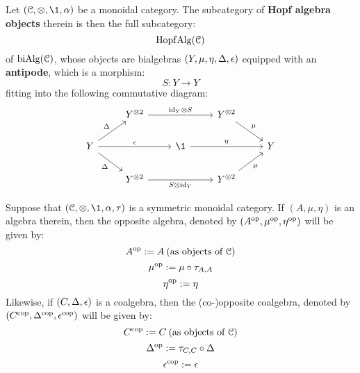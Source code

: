         \begin{definition} \label{def: hopf_algebras_in_monoidal_categories}
            Let $(\C, \tensor, \1, \alpha)$ be a monoidal category. The subcategory of \textbf{Hopf algebra objects} therein is then the full subcategory:
                $$\mathrm{Hopf}\mathrm{Alg}(\mathcal{C})$$
            of $\mathrm{bi}\mathrm{Alg}(\mathcal{C})$, whose objects are bialgebras $(Y, \mu, \eta, \Delta, \epsilon)$ equipped with an \textbf{antipode}, which is a morphism:
                $$S: Y \to Y$$
            fitting into the following commutative diagram:
                $$
                    \begin{tikzcd}
                	& {Y^{\tensor 2}} && {Y^{\tensor 2}} \\
                	Y && \1 && Y \\
                	& {Y^{\tensor 2}} && {Y^{\tensor 2}}
                	\arrow["{\id_Y \tensor S}", from=1-2, to=1-4]
                	\arrow["\mu", from=1-4, to=2-5]
                	\arrow["\Delta", from=2-1, to=1-2]
                	\arrow["\e", from=2-1, to=2-3]
                	\arrow["\Delta"', from=2-1, to=3-2]
                	\arrow["\eta", from=2-3, to=2-5]
                	\arrow["{S \tensor \id_Y}"', from=3-2, to=3-4]
                	\arrow["\mu"', from=3-4, to=2-5]
                    \end{tikzcd}
                $$
        \end{definition}
        \begin{convention}
            Suppose that $(\C, \tensor, \1, \alpha, \tau)$ is a symmetric monoidal category. If $(A, \mu, \eta)$ is an algebra therein, then the opposite algebra, denoted by $(A^{\mathrm{op}}, \mu^{\mathrm{op}}, \eta^{\mathrm{op}})$ will be given by:
                $$A^{\mathrm{op}} := A \: \text{(as objects of $\mathcal{C}$)}$$
                $$\mu^{\mathrm{op}} := \mu \circ \tau_{A, A}$$
                $$\eta^{\mathrm{op}} := \eta$$
            Likewise, if $(C, \Delta, \epsilon)$ is a coalgebra, then the (co-)opposite coalgebra, denoted by $(C^{\mathrm{cop}}, \Delta^{\mathrm{cop}}, \epsilon^{\mathrm{cop}})$ will be given by:
                $$C^{\mathrm{cop}} := C \: \text{(as objects of $\mathcal{C}$)}$$
                $$\Delta^{\mathrm{op}} := \tau_{C, C} \circ \Delta$$
                $$\epsilon^{\mathrm{cop}} := \epsilon$$
        \end{convention}
        \begin{lemma} \label{lemma: antipodes_are_anti_homomorphisms}
            
        \end{lemma}
